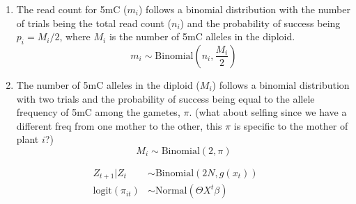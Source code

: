 \documentclass[preview]{standalone}
\begin{document}
\begin{enumerate}
\item The read count for 5mC (\(m_i\)) follows a binomial distribution
  with the number of trials being the total read count (\(n_i\)) and
  the probability of success being \(p_i = M_i / 2\), where \(M_i\) is
  the number of 5mC alleles in the diploid.
  \begin{displaymath}
    m_i \sim \mathrm{Binomial}(n_i, \frac{M_i}{2})
  \end{displaymath}
\item The number of 5mC alleles in the diploid (\(M_i\)) follows a
  binomial distribution with two trials and the probability of success
  being equal to the allele frequency of 5mC among the gametes,
  \(\pi\). (what about selfing since we have a different freq from one
  mother to the other, this \(\pi\) is specific to the mother of plant
  \(i\)?)
  \begin{displaymath}
     M_i \sim \mathrm{Binomial}(2, \pi)
  \end{displaymath}
\end{enumerate}
\begin{align}
  Z_{t+1}|Z_t &\sim \mathrm{Binomial}(2N, g(x_t))
  \\ \mathrm{logit}(\pi_{it}) &\sim \mathrm{Normal}(\Theta X^t\beta)
\end{align}
\end{document}
